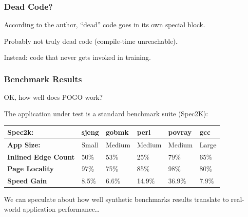 \begin{frame}
\frametitle{Dead Code?}

\large
\begin{changemargin}{1cm}
According to the author, ``dead'' code goes in its own special block. 

Probably not truly dead code (compile-time unreachable).

Instead: code that never gets invoked in training.
\end{changemargin}

\end{frame}



\begin{frame}
\frametitle{Benchmark Results}
\large \begin{changemargin}{2cm}
OK, how well does POGO work?

The application under test is a standard benchmark suite (Spec2K):
\end{changemargin}

\begin{center}
\begin{tabular}{l|l|l|l|l|l}
	\textbf{Spec2k:} & \textbf{sjeng} & \textbf{gobmk} & \textbf{perl} & \textbf{povray} & \textbf{gcc}\\ \hline
	\textbf{App Size:} &  {Small} & {Medium} & {Medium} & {Medium} & {Large} \\ \hline
	\textbf{Inlined Edge Count} & 50\% & 53\% & 25\% & 79\% & 65\% \\ \hline
	\textbf{Page Locality} & 97\% & 75\% & 85\% & 98\% & 80\% \\ \hline
	\textbf{Speed Gain} & 8.5\% & 6.6\% & 14.9\% & 36.9\% & 7.9\% \\ 
\end{tabular}
\end{center}

\large \begin{changemargin}{2cm}
We can speculate about how well synthetic benchmarks results translate to real-world application performance\ldots
\end{changemargin}

\end{frame}




